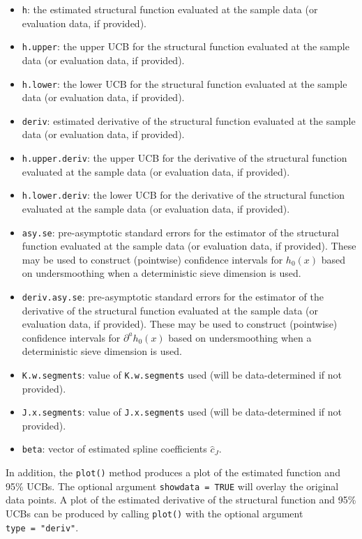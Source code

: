 \documentclass[
]{jss}
\begin{document}
\begin{itemize}
\item
  \texttt{h}: the estimated structural function evaluated at the sample
  data (or evaluation data, if provided).
\item
  \texttt{h.upper}: the upper UCB for the structural function evaluated
  at the sample data (or evaluation data, if provided).
\item
  \texttt{h.lower}: the lower UCB for the structural function evaluated
  at the sample data (or evaluation data, if provided).
\item
  \texttt{deriv}: estimated derivative of the structural function
  evaluated at the sample data (or evaluation data, if provided).
\item
  \texttt{h.upper.deriv}: the upper UCB for the derivative of the
  structural function evaluated at the sample data (or evaluation data,
  if provided).
\item
  \texttt{h.lower.deriv}: the lower UCB for the derivative of the
  structural function evaluated at the sample data (or evaluation data,
  if provided).
\item
  \texttt{asy.se}: pre-asymptotic standard errors for the estimator of
  the structural function evaluated at the sample data (or evaluation
  data, if provided). These may be used to construct (pointwise)
  confidence intervals for \(h_0(x)\) based on undersmoothing when a
  deterministic sieve dimension is used.
\item
  \texttt{deriv.asy.se}: pre-asymptotic standard errors for the
  estimator of the derivative of the structural function evaluated at
  the sample data (or evaluation data, if provided). These may be used
  to construct (pointwise) confidence intervals for
  \(\partial^a h_0(x)\) based on undersmoothing when a deterministic
  sieve dimension is used.
\item
  \texttt{K.w.segments}: value of \texttt{K.w.segments} used (will be
  data-determined if not provided).
\item
  \texttt{J.x.segments}: value of \texttt{J.x.segments} used (will be
  data-determined if not provided).
\item
  \texttt{beta}: vector of estimated spline coefficients \(\hat c_J\).
\end{itemize}

In addition, the \texttt{plot()} method produces a plot of the estimated
function and 95\% UCBs. The optional argument \texttt{showdata\ =\ TRUE}
will overlay the original data points. A plot of the estimated
derivative of the structural function and 95\% UCBs can be produced by
calling \texttt{plot()} with the optional argument
\texttt{type\ =\ "deriv"}.
\end{document}
